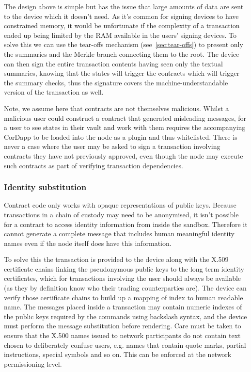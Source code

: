 \documentclass{article}
\begin{document}
The design above is simple but has the issue that large amounts of data are sent to the device which it doesn't
need. As it's common for signing devices to have constrained memory, it would be unfortunate if the complexity of a
transaction ended up being limited by the RAM available in the users' signing devices. To solve this we can use the
tear-offs mechanism (see~\cref{sec:tear-offs}) to present only the summaries and the Merkle branch connecting them
to the root. The device can then sign the entire transaction contents having seen only the textual summaries,
knowing that the states will trigger the contracts which will trigger the summary checks, thus the signature covers
the machine-understandable version of the transaction as well.

Note, we assume here that contracts are not themselves malicious. Whilst a malicious user could construct a
contract that generated misleading messages, for a user to see states in their vault and work with them requires
the accompanying CorDapp to be loaded into the node as a plugin and thus whitelisted. There is never a case where
the user may be asked to sign a transaction involving contracts they have not previously approved, even though the
node may execute such contracts as part of verifying transaction dependencies.

\subsubsection{Identity substitution}

Contract code only works with opaque representations of public keys. Because transactions in a chain of custody may
need to be anonymised, it isn't possible for a contract to access identity information from inside the sandbox.
Therefore it cannot generate a complete message that includes human meaningful identity names even if the node
itself does have this information.

To solve this the transaction is provided to the device along with the X.509 certificate chains linking the
pseudonymous public keys to the long term identity certificates, which for transactions involving the user should
always be available (as they by definition know who their trading counterparties are). The device can verify those
certificate chains to build up a mapping of index to human readable name. The messages placed inside a transaction
may contain numeric indexes of the public keys required by the commands using backslash syntax, and the device must
perform the message substitution before rendering. Care must be taken to ensure that the X.500 names issued to
network participants do not contain text chosen to deliberately confuse users, e.g. names that contain quote marks,
partial instructions, special symbols and so on. This can be enforced at the network permissioning level.
\end{document}
